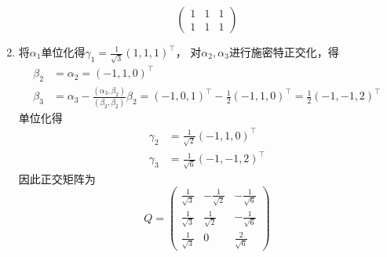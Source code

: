 \begin{solution}
\begin{enumerate}[(1)]
\[\begin{pmatrix}
                      1 & 1 & 1 \\
                      1 & 1 & 1
                  \end{pmatrix}
              \]
        \item 将$\alpha_1$单位化得$\gamma_1 = \frac{1}{\sqrt{3}}(1,1,1)^\intercal$，
              对$\alpha_2,\alpha_3$进行施密特正交化，得
              \begin{align*}
                  \beta_2 & = \alpha_2 = (-1,1,0)^\intercal                                  \\
                  \beta_3 & = \alpha_3 - \frac{(\alpha_3,\beta_2)}{(\beta_2,\beta_2)}\beta_2
                  = (-1,0,1)^\intercal - \frac{1}{2}(-1,1,0)^\intercal = \frac{1}{2}(-1,-1,2)^\intercal
              \end{align*}
              单位化得
              \begin{align*}
                  \gamma_2 & = \frac{1}{\sqrt{2}}(-1,1,0)^\intercal  \\
                  \gamma_3 & = \frac{1}{\sqrt{6}}(-1,-1,2)^\intercal
              \end{align*}
              因此正交矩阵为
              \[
                  Q =
                  \begin{pmatrix}
                      \frac{1}{\sqrt{3}} & -\frac{1}{\sqrt{2}} & -\frac{1}{\sqrt{6}} \\
                      \frac{1}{\sqrt{3}} & \frac{1}{\sqrt{2}}  & -\frac{1}{\sqrt{6}} \\
                      \frac{1}{\sqrt{3}} & 0                   & \frac{2}{\sqrt{6}}
                  \end{pmatrix}
              \]
    \end{enumerate}
\end{solution}

